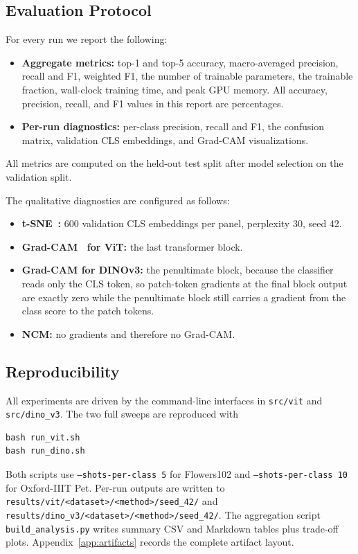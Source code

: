 \documentclass[journal,11pt]{IEEEtran}
\begin{document}
\subsection{Evaluation Protocol}
For every run we report the following:
\begin{itemize}
  \setlength{\itemsep}{1pt}
  \item \textbf{Aggregate metrics:} top-1 and top-5 accuracy, macro-averaged precision, recall and F1, weighted F1, the number of trainable parameters, the trainable fraction, wall-clock training time, and peak GPU memory. All accuracy, precision, recall, and F1 values in this report are percentages.
  \item \textbf{Per-run diagnostics:} per-class precision, recall and F1, the confusion matrix, validation CLS embeddings, and Grad-CAM visualizations.
\end{itemize}
All metrics are computed on the held-out test split after model selection on the validation split.

The qualitative diagnostics are configured as follows:
\begin{itemize}
  \setlength{\itemsep}{1pt}
  \item \textbf{t-SNE~\cite{vandermaaten2008tsne}:} 600 validation CLS embeddings per panel, perplexity 30, seed 42.
  \item \textbf{Grad-CAM~\cite{selvaraju2017gradcam} for ViT:} the last transformer block.
  \item \textbf{Grad-CAM for DINOv3:} the penultimate block, because the classifier reads only the CLS token, so patch-token gradients at the final block output are exactly zero while the penultimate block still carries a gradient from the class score to the patch tokens.
  \item \textbf{NCM:} no gradients and therefore no Grad-CAM.
\end{itemize}

\subsection{Reproducibility}
All experiments are driven by the command-line interfaces in \texttt{src/vit} and \texttt{src/dino\_v3}. The two full sweeps are reproduced with
\begin{verbatim}
bash run_vit.sh
bash run_dino.sh
\end{verbatim}
\begin{sloppypar}\raggedright
Both scripts use \texttt{--shots-per-class 5} for Flowers102 and \texttt{--shots-per-class 10} for Oxford-IIIT Pet. Per-run outputs are written to \texttt{results/vit/<dataset>/<method>/seed\_42/} and \texttt{results/dino\_v3/<dataset>/<method>/seed\_42/}. The aggregation script \texttt{build\_analysis.py} writes summary CSV and Markdown tables plus trade-off plots. Appendix~\ref{app:artifacts} records the complete artifact layout.
\end{sloppypar}
\end{document}
